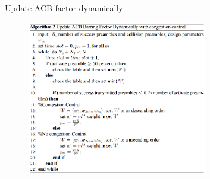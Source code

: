 \documentclass{beamer}
\begin{document}
\begin{frame}{Update ACB factor dynamically}
    \begin{figure}[t]
        \centering
        \includegraphics[width=0.7\textwidth]{figures/A_2.png}
    \end{figure}
\end{frame}
\end{document}
